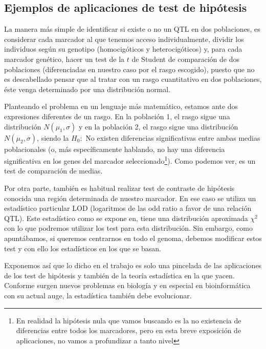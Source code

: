 \documentclass[a4paper,12pt]{article}
\begin{document}
\subsection{Ejemplos de aplicaciones de test de hipótesis}
La manera más simple de identificar si existe o no un QTL en dos poblaciones, es considerar cada marcador al que tenemos acceso individualmente, dividir los individuos según su genotipo (homocigóticos y heterocigóticos) y, para cada marcador genético, hacer un test de la $t$ de Student de comparación de dos poblaciones (diferenciadas en nuestro caso por el rasgo escogido), puesto que no es descabellado pensar que al tratar con un rasgo cuantitativo en dos poblaciones, éste venga determinado por una distribución normal.

Planteando el problema en un lenguaje más matemático, estamos ante dos expresiones diferentes de un rasgo. En la población 1, el rasgo sigue una distribución $N(\mu_1,\sigma)$ y en la población 2, el rasgo sigue una distribución $N(\mu_2,\sigma)$, siendo la $H_0:$ No existen diferencias significativas entre ambas medias poblacionales (o, más específicamente hablando, no hay una diferencia significativa en los genes del marcador seleccionado\footnote{En realidad la hipótesis nula que vamos buscando es la no existencia de diferencias entre todos los marcadores, pero en esta breve exposición de aplicaciones, no vamos a profundizar a tanto nivel}).
Como podemos ver, es un test de comparación de medias.

Por otra parte, también es habitual realizar test de contraste de hipótesis conocida una región determinada de nuestro marcador. En ese caso se utiliza un estadístico particular LOD (logaritmos de las odd ratio a favor de una relación QTL). Este estadístico como se expone en,\cite{uned2} tiene una distribución aproximada $\chi^2$
con lo que podremos utilizar los test para esta distribución.
Sin embargo, como apuntábamos, si queremos centrarnos en todo el genoma, debemos modificar estos test y con ello los estadísticos en los que se basan. 

Exponemos así que lo dicho en el trabajo es solo una pincelada de las aplicaciones de los test de hipótesis y también de la teoría estadística en la que yacen. Conforme surgen nuevos problemas en biología y en especial en bioinformática con su actual auge, la estadística también debe evolucionar.































\end{document}
